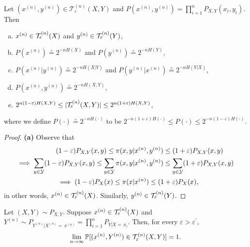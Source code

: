 \documentclass[11pt,a4paper]{article}
\begin{document}
\begin{theorem}
    Let $(x^{(n)},y^{(n)})\in \mathcal{T}_\varepsilon^{(n)}(X,Y)$ and $P(x^{(n)}, y^{(n)}) = \prod_{i=1}^{n}P_{X,Y}(x_i,y_i)$. Then
    \begin{enumerate}[(a)]
        \item $x^{(n)}\in\mathcal{T}^{(n)}_\varepsilon(X)$ and $y^{(n)}\in \mathcal{T}^{(n)}_\varepsilon(Y)$,
        \item $P(x^{(n)}) \overset{\circ}{=} 2^{-nH(X)}$ and $P(y^{(n)}) \overset{\circ}{=} 2^{-nH(Y)}$,
        \item $P(x^{(n)}|y^{(n)}) \overset{\circ}{=} 2^{-nH(X|Y)}$ and $P(y^{(n)}|x^{(n)}) \overset{\circ}{=} 2^{-nH(Y|X)}$,
        \item $P(x^{(n)},y^{(n)}) \overset{\circ}{=} 2^{-nH(X,Y)}$,
        \item $2^{n(1-\varepsilon)H(X,Y)} \le |\mathcal{T}^{(n)}_\varepsilon(X,Y)| \le 2^{n(1+\varepsilon)H(X,Y)}$,
    \end{enumerate}
    where we define $P(\cdot) \overset{\circ}{=} 2^{-nH(\cdot)}$ to be $2^{-n(1+\varepsilon)H(\cdot)} \le P(\cdot) \le 2^{-n(1-\varepsilon)H(\cdot)}$.
\end{theorem}

\begin{proof}
    \textbf{(a)} Observe that 
    \begin{align*}
        (1-\varepsilon) P_{X,Y}(x,y) \le \pi(x,y&|x^{(n)},y^{(n)}) \le (1+\varepsilon) P_{X,Y}(x,y) \\
        \implies \sum_{y\in\mathcal{Y}}(1-\varepsilon)  P_{X,Y}(x,y) \le \sum_{y\in\mathcal{Y}} \pi(x,y&|x^{(n)},y^{(n)}) \le \sum_{y\in\mathcal{Y}} (1+\varepsilon) P_{X,Y}(x,y) \\ 
        \implies (1-\varepsilon) P_{X}(x) \le \pi(x&|x^{(n)}) \le (1+\varepsilon) P_{X}(x),
    \end{align*}
    in other words, $x^{(n)}\in\mathcal{T}^{(n)}_\varepsilon(X)$. Similarly, $y^{(n)}\in \mathcal{T}^{(n)}_\varepsilon(Y)$.


    
    
\end{proof}

\begin{theorem}
    Let $(X,Y)\sim P_{X,Y}$. Suppose $x^{(n)}\in\mathcal{T}^{(n)}_\varepsilon(X)$ and $Y^{(n)}\sim P_{Y^{(n)}|X^{(n)} =\,x^{(n)}} = \prod_{i=1}^{n} P_{Y|X =\, x_i}$. Then, for every $\varepsilon > \varepsilon^\prime$,
    \begin{equation*}
        \lim_{n\rightarrow\infty} \mathbb{P}[(x^{(n)},Y^{(n)})\in\mathcal{T}^{(n)}_\varepsilon(X,Y)] = 1.
    \end{equation*}
\end{theorem}
\end{document}
